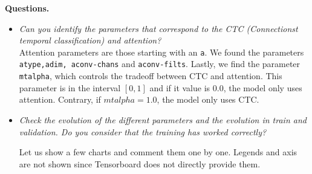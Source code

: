 \documentclass[a4paper]{article}
\def\inline{\lstinline[basicstyle=\ttfamily,keywordstyle={}]}
\begin{document}
\textbf{Questions.}
\begin{itemize}
  \item \emph{Can you identify the parameters that correspond to the CTC (Connectionst temporal classification) and attention?}\\
        Attention parameters are those starting with an \inline{a}. We found the parameters \inline{atype,adim, aconv-chans} and \inline{aconv-filts}. Lastly, we find the parameter \inline{mtalpha}, which controls the tradeoff between CTC and attention. This parameter is in the interval \([0,1]\) and if it value is  \(0.0\), the model only uses attention. Contrary, if \(mtalpha = 1.0\), the model only uses CTC.
  \item \emph{Check the evolution of the different parameters and the evolution in train and validation. Do you consider that the training has worked correctly? }

        Let us show a few charts and comment them one by one. Legends and axis are not shown since Tensorboard does not directly provide them.


\end{itemize}
\end{document}
